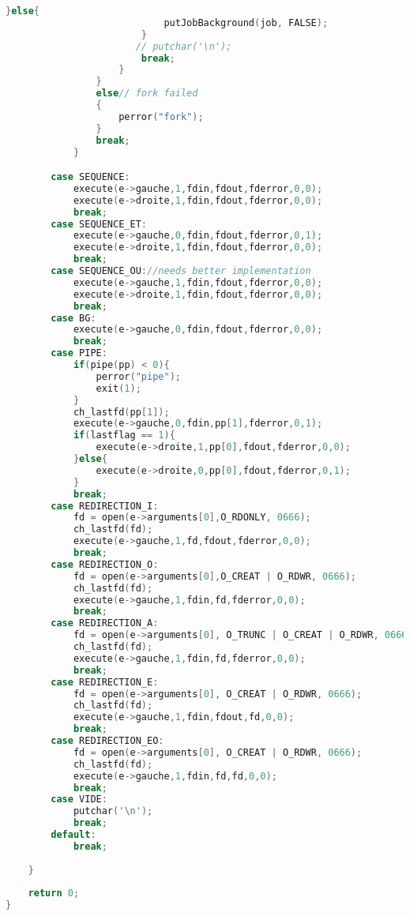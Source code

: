 \documentclass[paper=a4, fontsize=11pt]{scrartcl}
\numberwithin{equation}{section}		%
\numberwithin{figure}{section}			%
\numberwithin{table}{section}				%
\begin{document}
\begin{lstlisting}[language=c]
                        }else{
                            putJobBackground(job, FALSE);
                        }
                       // putchar('\n');
                        break;
                    }
                }
                else// fork failed 
                {
                    perror("fork");
                }
                break;
            }            

        case SEQUENCE:
            execute(e->gauche,1,fdin,fdout,fderror,0,0);
            execute(e->droite,1,fdin,fdout,fderror,0,0);
            break;
        case SEQUENCE_ET:
            execute(e->gauche,0,fdin,fdout,fderror,0,1);
            execute(e->droite,1,fdin,fdout,fderror,0,0);
            break;
        case SEQUENCE_OU://needs better implementation 
            execute(e->gauche,1,fdin,fdout,fderror,0,0);
            execute(e->droite,1,fdin,fdout,fderror,0,0);
            break;
        case BG:
            execute(e->gauche,0,fdin,fdout,fderror,0,0);
            break;
        case PIPE:
            if(pipe(pp) < 0){
                perror("pipe");
                exit(1);
            }
            ch_lastfd(pp[1]);
            execute(e->gauche,0,fdin,pp[1],fderror,0,1);
            if(lastflag == 1){
                execute(e->droite,1,pp[0],fdout,fderror,0,0);
            }else{
                execute(e->droite,0,pp[0],fdout,fderror,0,1);
            }
            break;
        case REDIRECTION_I:
            fd = open(e->arguments[0],O_RDONLY, 0666);
            ch_lastfd(fd);
            execute(e->gauche,1,fd,fdout,fderror,0,0);
            break;
        case REDIRECTION_O:
            fd = open(e->arguments[0],O_CREAT | O_RDWR, 0666);
            ch_lastfd(fd);
            execute(e->gauche,1,fdin,fd,fderror,0,0);
            break;
        case REDIRECTION_A:
            fd = open(e->arguments[0], O_TRUNC | O_CREAT | O_RDWR, 0666);
            ch_lastfd(fd);
            execute(e->gauche,1,fdin,fd,fderror,0,0);
            break;
        case REDIRECTION_E:
            fd = open(e->arguments[0], O_CREAT | O_RDWR, 0666);
            ch_lastfd(fd);
            execute(e->gauche,1,fdin,fdout,fd,0,0);
            break;
        case REDIRECTION_EO:
            fd = open(e->arguments[0], O_CREAT | O_RDWR, 0666);
            ch_lastfd(fd);
            execute(e->gauche,1,fdin,fd,fd,0,0);
            break;
        case VIDE:
            putchar('\n');
            break;
        default:
            break;
            
    }
  
    return 0;
}



\end{lstlisting}
\end{document}
